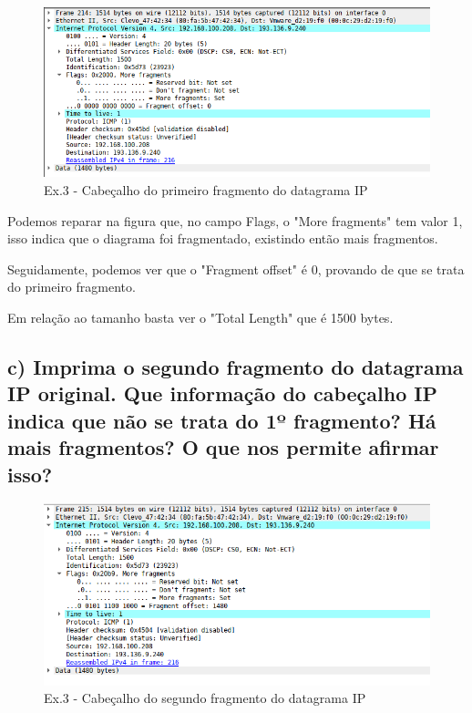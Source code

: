 \documentclass[a4paper]{report}
\begin{document}
\begin{figure}[H]
    \centering 
    \includegraphics[width=\textwidth]{images/fragmentDatagramaIpEx3.png}
    \caption{Ex.3 - Cabeçalho do primeiro fragmento do datagrama IP}
    \label{fig:fragmentDatagramaIpEx3}
\end{figure}

Podemos reparar na figura que, no campo Flags, o "More fragments" tem valor 1, isso
indica que o diagrama foi fragmentado, existindo então mais fragmentos.

Seguidamente, podemos ver que o "Fragment offset" é 0, provando de que se trata
do primeiro fragmento.

Em relação ao tamanho basta ver o "Total Length" que é 1500 bytes.

\subsection{c) Imprima o segundo fragmento do datagrama IP original. Que
informação do cabeçalho IP indica que não se trata do 1º fragmento? 
Há mais fragmentos? O que nos permite afirmar isso?}

\begin{figure}[H]
    \centering 
    \includegraphics[width=\textwidth]{images/fragment2DatagramaIpEx3.png}
    \caption{Ex.3 - Cabeçalho do segundo fragmento do datagrama IP}
    \label{fig:fragment2DatagramaIpEx3}
\end{figure}
\end{document}
